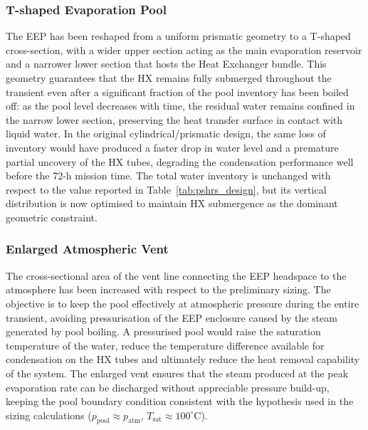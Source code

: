 \documentclass[a4paper,11pt]{article}
\numberwithin{subsubsection}{subsection}
\numberwithin{subsection}{section}
\begin{document}
\subsubsection{T-shaped Evaporation Pool}
The EEP has been reshaped from a uniform prismatic geometry to a
T-shaped cross-section, with a wider upper section acting as the main
evaporation reservoir and a narrower lower section that hosts the Heat
Exchanger bundle. This geometry guarantees that the HX remains fully
submerged throughout the transient even after a significant fraction of
the pool inventory has been boiled off: as the pool level decreases
with time, the residual water remains confined in the narrow lower
section, preserving the heat transfer surface in contact with liquid
water. In the original cylindrical/prismatic design, the same loss of
inventory would have produced a faster drop in water level and a
premature partial uncovery of the HX tubes, degrading the condensation
performance well before the 72-h mission time. The total water inventory
is unchanged with respect to the value reported in
Table~\ref{tab:pshrs_design}, but its vertical distribution is now
optimised to maintain HX submergence as the dominant geometric
constraint.

\subsubsection{Enlarged Atmospheric Vent}
The cross-sectional area of the vent line connecting the EEP headspace
to the atmosphere has been increased with respect to the preliminary
sizing. The objective is to keep the pool effectively at atmospheric
pressure during the entire transient, avoiding pressurisation of the
EEP enclosure caused by the steam generated by pool boiling.
A pressurised pool would raise the saturation temperature of the water,
reduce the temperature difference available for condensation on the HX
tubes and ultimately reduce the heat removal capability of the system.
The enlarged vent ensures that the steam produced at the peak
evaporation rate can be discharged without appreciable pressure
build-up, keeping the pool boundary condition consistent with the
hypothesis used in the sizing calculations
($p_{\text{pool}} \approx p_{\text{atm}}$, $T_{\text{sat}} \approx 100^{\circ}$C).
\end{document}
